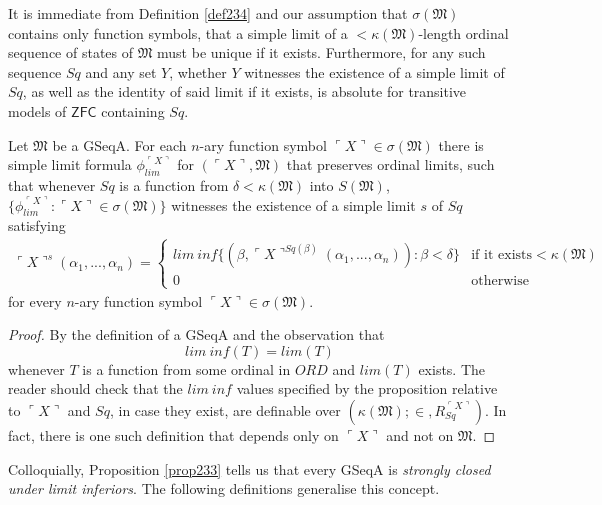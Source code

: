 \documentclass[12pt]{article}
\numberwithin{equation}{section}
\begin{document}
It is immediate from Definition \ref{def234} and our assumption that $\sigma(\mathfrak{M})$ contains only function symbols, that a simple limit of a $< \kappa(\mathfrak{M})$-length ordinal sequence of states of $\mathfrak{M}$ must be unique if it exists. Furthermore, for any such sequence $Sq$ and any set $Y$, whether $Y$ witnesses the existence of a simple limit of $Sq$, as well as the identity of said limit if it exists, is absolute for transitive models of $\mathsf{ZFC}$ containing $Sq$.

\begin{prop}\label{prop233}
Let $\mathfrak{M}$ be a GSeqA. For each $n$-ary function symbol $\ulcorner X \urcorner \in \sigma(\mathfrak{M})$ there is simple limit formula $\phi_{lim}^{\ulcorner X \urcorner}$ for $(\ulcorner X \urcorner, \mathfrak{M})$ that preserves ordinal limits, such that whenever $Sq$ is a function from $\delta < \kappa(\mathfrak{M})$ into $S(\mathfrak{M})$, $\{\phi_{lim}^{\ulcorner X \urcorner} : \ulcorner X \urcorner \in \sigma(\mathfrak{M})\}$ witnesses the existence of a simple limit $s$ of $Sq$ satisfying 
\begin{gather*}
    \ulcorner X \urcorner^{s} (\alpha_1, ..., \alpha_n) = 
    \begin{cases}
        lim \ inf \{(\beta, \ulcorner X \urcorner^{Sq(\beta)}(\alpha_1, ..., \alpha_n)) : \beta < \delta\} & \!\!\!\! \text{if it exists} < \kappa(\mathfrak{M}) \\
        0 & \!\!\!\! \text{otherwise}
    \end{cases} 
\end{gather*}
for every $n$-ary function symbol $\ulcorner X \urcorner \in \sigma(\mathfrak{M})$.
\end{prop}

\begin{proof}
By the definition of a GSeqA and the observation that 
\begin{equation*}
    lim \ inf (T) = lim (T)
\end{equation*}
whenever $T$ is a function from some ordinal in $ORD$ and $lim (T)$ exists. The reader should check that the $lim \ inf$ values specified by the proposition relative to $\ulcorner X \urcorner$ and $Sq$, in case they exist, are definable over $(\kappa(\mathfrak{M}); \in, R_{Sq}^{\ulcorner X \urcorner})$. In fact, there is one such definition that depends only on $\ulcorner X \urcorner$ and not on $\mathfrak{M}$.
\end{proof}

Colloquially, Proposition \ref{prop233} tells us that every GSeqA is \emph{strongly closed under limit inferiors}. The following definitions generalise this concept.
\end{document}

